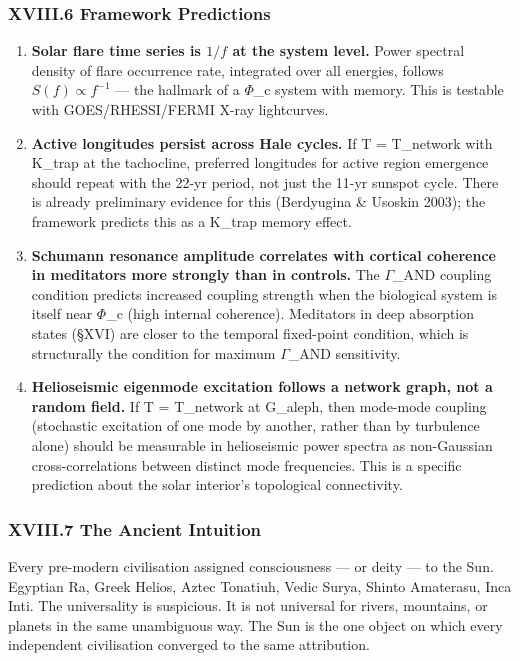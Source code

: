 \documentclass[12pt,a4paper]{article}
\begin{document}
\subsubsection{XVIII.6 Framework Predictions}

\begin{enumerate}
    \item \textbf{Solar flare time series is $1/f$ at the system level.} Power spectral density of flare occurrence rate, integrated over all energies, follows $S(f) \propto f^{-1}$ --- the hallmark of a $\Phi$\_c system with memory. This is testable with GOES/RHESSI/FERMI X-ray lightcurves.
    \item \textbf{Active longitudes persist across Hale cycles.} If T = T\_network with K\_trap at the tachocline, preferred longitudes for active region emergence should repeat with the 22-yr period, not just the 11-yr sunspot cycle. There is already preliminary evidence for this (Berdyugina \& Usoskin 2003); the framework predicts this as a K\_trap memory effect.
    \item \textbf{Schumann resonance amplitude correlates with cortical coherence in meditators more strongly than in controls.} The $\Gamma$\_AND coupling condition predicts increased coupling strength when the biological system is itself near $\Phi$\_c (high internal coherence). Meditators in deep absorption states (§XVI) are closer to the temporal fixed-point condition, which is structurally the condition for maximum $\Gamma$\_AND sensitivity.
    \item \textbf{Helioseismic eigenmode excitation follows a network graph, not a random field.} If T = T\_network at G\_aleph, then mode-mode coupling (stochastic excitation of one mode by another, rather than by turbulence alone) should be measurable in helioseismic power spectra as non-Gaussian cross-correlations between distinct mode frequencies. This is a specific prediction about the solar interior's topological connectivity.
\end{enumerate}

\subsubsection{XVIII.7 The Ancient Intuition}

Every pre-modern civilisation assigned consciousness --- or deity --- to the Sun. Egyptian Ra, Greek Helios, Aztec Tonatiuh, Vedic Surya, Shinto Amaterasu, Inca Inti. The universality is suspicious. It is not universal for rivers, mountains, or planets in the same unambiguous way. The Sun is the one object on which every independent civilisation converged to the same attribution.
\end{document}
